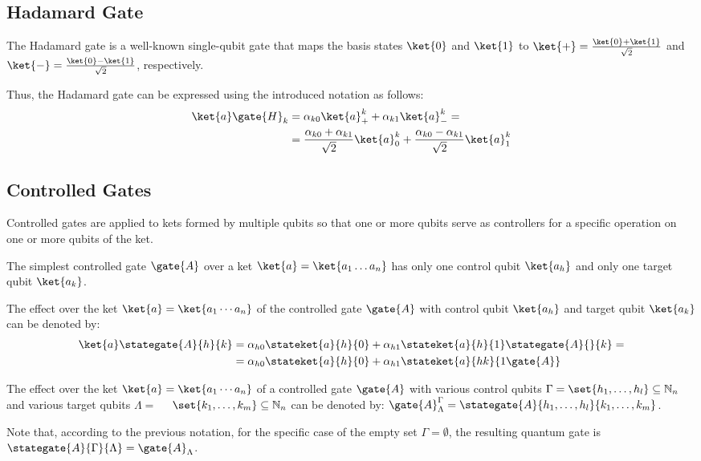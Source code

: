 \subsection{Hadamard Gate}
The Hadamard gate is a well-known single-qubit gate that maps the basis states $\ket{0}$ and $\ket{1}$  to $\ket{+}=\frac{\ket{0}+\ket{1}}{\sqrt{2}}$ and $\ket{-}=\frac{\ket{0}-\ket{1}}{\sqrt{2}}$, respectively.

Thus, the Hadamard gate can be expressed using the introduced notation as follows:
\begin{align}
    \label{eq:hadamard}
    \ket{a}\gate{H}_k&=\alpha_{k0}\ket{a}^{k}_{+}+\alpha_{k1}\ket{a}^{k}_{-}=\\
    &=
    \frac{\alpha_{k0}+\alpha_{k1}}{\sqrt{2}}\ket{a}^{k}_{0}+\frac{\alpha_{k0}-\alpha_{k1}}{\sqrt{2}}\ket{a}^{k}_{1}
\end{align}

\subsection{Controlled Gates}
Controlled gates are applied to kets formed by multiple qubits so that one or more qubits serve as controllers for a specific operation on one or more qubits of the ket.

The simplest controlled gate $\gate{A}$ over a ket $\ket{a}=\ket{a_1\dots a_n}$ has only one control qubit $\ket{a_h}$ and only one target qubit $\ket{a_k}$.

\begin{notation}
    The effect over the  ket $\ket{a}=\ket{a_1\cdots a_n}$ of the controlled gate $\gate{A}$ with control qubit $\ket{a_h}$ and  target qubit $\ket{a_k}$ can be denoted by:
    \begin{align}
        \label{eq:generic-controlled-gate}
        \ket{a}\stategate{A}{h}{k}&=\alpha_{h0}\stateket{a}{h}{0}+\alpha_{h1} \stateket{a}{h}{1}\stategate{A}{}{k}= \\
        &=\alpha_{h0}\stateket{a}{h}{0}+\alpha_{h1} \stateket{a}{hk}{1\gate{A}}
    \end{align}
\end{notation}

\begin{notation}
    The effect over the  ket $\ket{a}=\ket{a_1\cdots a_n}$ of a controlled gate $\gate{A}$ with various control qubits $\Gamma=\set{h_1,\dots,h_l}\subseteq\mathbb{N}_n$  and various target qubits $\Lambda=$ $\text{ }$ $\set{k_1,\dots,k_m}\subseteq\mathbb{N}_n$ can be denoted by:
    $\gate{A}^{\Gamma}_{\Lambda}=\stategate{A}{h_1,\dots,h_l}{k_1,\dots, k_m}$.
\end{notation}
Note that, according to the previous notation, for the specific case of the empty set $\Gamma=\emptyset$, the resulting quantum gate is $\stategate{A}{\Gamma}{\Lambda}=\gate{A}_{\Lambda}$.

